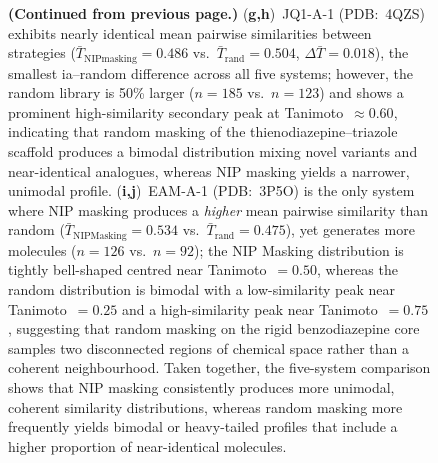 \documentclass[a4paper,12pt]{article}
\begin{document}
\begin{figure}[p]
    \caption{%
        \textbf{(Continued from previous page.)}
        (\textbf{g,h})~JQ1-A-1 (PDB:~4QZS) exhibits nearly
        identical mean pairwise similarities between strategies
        ($\bar{T}_{\mathrm{NIP masking }} = 0.486$ vs.\
        $\bar{T}_{\mathrm{rand}} = 0.504$, $\Delta\bar{T} = 0.018$),
        the smallest ia--random difference across all five systems;
        however, the random library is 50\% larger ($n = 185$
        vs.\ $n = 123$) and shows a prominent high-similarity
        secondary peak at Tanimoto~$\approx 0.60$, indicating that
        random masking of the thienodiazepine--triazole scaffold
        produces a bimodal distribution mixing novel variants and
        near-identical analogues, whereas NIP masking  yields a
        narrower, unimodal profile.
        (\textbf{i,j})~EAM-A-1 (PDB:~3P5O) is the only system
        where NIP masking produces a \emph{higher} mean pairwise
        similarity than random ($\bar{T}_{\mathrm{NIP Masking}} = 0.534$
        vs.\ $\bar{T}_{\mathrm{rand}} = 0.475$), yet generates
        more molecules ($n = 126$ vs.\ $n = 92$); the NIP Masking
        distribution is tightly bell-shaped centred near
        Tanimoto~$= 0.50$, whereas the random distribution is
        bimodal with a low-similarity peak near
        Tanimoto~$= 0.25$ and a high-similarity peak near
        Tanimoto~$= 0.75$, suggesting that random masking on the
        rigid benzodiazepine core samples two disconnected regions
        of chemical space rather than a coherent neighbourhood.
        Taken together, the five-system comparison shows that NIP
        masking consistently produces more unimodal, coherent
        similarity distributions, whereas random masking more
        frequently yields bimodal or heavy-tailed profiles that
        include a higher proportion of near-identical molecules.
    }
\end{figure}
 
\end{document}
